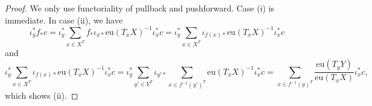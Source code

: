 \begin{proof}
	We only use functoriality of pullback and pushforward. Case (i) is immediate. In case (ii), we have
	\begin{equation}
		\iota_y^* f_* c = \iota_y^* \sum_{x \in X^T} f_* \iota_{x*} \mathrm{eu}(T_x X)^{-1} \iota_x^* c = \iota_y^* \sum_{x \in X^T} \iota_{f(x)*} \mathrm{eu}(T_x X)^{-1} \iota_x^* c
	\end{equation}
	and
	\begin{equation}
    	\iota_y^* \sum_{x \in X^T} \iota_{f(x)*} \mathrm{eu}(T_x X)^{-1} \iota_x^* c = \iota_y^* \sum_{y' \in Y^T} \iota_{y'*} \sum_{x \in f^{-1}(y')^T}\mathrm{eu}(T_x X)^{-1} \iota_x^* c = \sum_{x \in f^{-1}(y)^T} \frac{\mathrm{eu}(T_y Y)}{\mathrm{eu}(T_x X)} \iota_x^* c,
	\end{equation}
	which shows (ii).
\end{proof}

